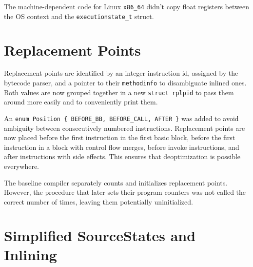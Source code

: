\documentclass[draft,final]{vutinfth} %
\begin{document}
    The machine-dependent code for Linux \texttt{x86\_64} didn't copy float registers between the OS context
    and the \lstinline{executionstate_t} struct.


    \section{Replacement Points}

    Replacement points are identified by an integer instruction id, assigned by the bytecode parser,
    and a pointer to their \lstinline{methodinfo} to disambiguate inlined ones.
    Both values are now grouped together in a new \lstinline{struct rplpid}
    to pass them around more easily and to conveniently print them.

    An \lstinline|enum Position { BEFORE_BB, BEFORE_CALL, AFTER }|
    was added
    to avoid ambiguity between consecutively numbered instructions.
    Replacement points are now placed
    before the first instruction in the first basic block,
    before the first instruction in a block with control flow merges,
    before invoke instructions,
    and after instructions with side effects.
    This ensures that deoptimization is possible everywhere.

    The baseline compiler separately counts and initializes replacement points.
    However, the procedure that later sets their program counters was not called the correct number of times,
    leaving them potentially uninitialized.


    \section{Simplified SourceStates and Inlining}
\end{document}
